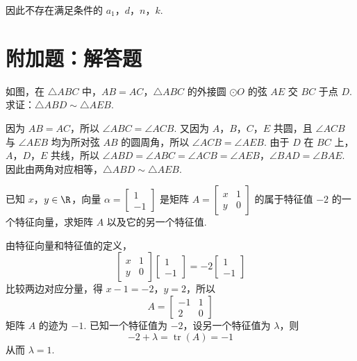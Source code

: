 \begin{solution}
\begin{enumerate}
因此不存在满足条件的 \(a_1\)，\(d\)，\(n\)，\(k\).
\end{enumerate}
\end{solution}

\section{附加题：解答题}

\begin{problem}[A]
如图，在 \(\triangle ABC\) 中，\(AB = AC\)，\(\triangle ABC\) 的外接圆 \(\odot O\) 的弦 \(AE\) 交 \(BC\) 于点 \(D\). 求证：\(\triangle ABD \sim \triangle AEB\).

\end{problem}

\begin{solution}
因为 \(AB=AC\)，所以 \(\angle ABC=\angle ACB\). 又因为 \(A\)，\(B\)，\(C\)，\(E\) 共圆，且 \(\angle ACB\) 与 \(\angle AEB\) 均为所对弦 \(AB\) 的圆周角，所以 \(\angle ACB=\angle AEB\). 由于 \(D\) 在 \(BC\) 上，\(A\)，\(D\)，\(E\) 共线，所以
\(\angle ABD=\angle ABC=\angle ACB=\angle AEB\)，\(\angle BAD=\angle BAE\).
因此由两角对应相等，\(\triangle ABD\sim\triangle AEB\).
\end{solution}

\reuseproblemnumber
\begin{problem}[B]
已知 \(x\)，\(y \in \R\)，向量 \(\alpha = \begin{bmatrix} 1 \\ -1 \end{bmatrix}\) 是矩阵 \(A = \begin{bmatrix} x & 1 \\ y & 0 \end{bmatrix}\) 的属于特征值 \(-2\) 的一个特征向量，求矩阵 \(A\) 以及它的另一个特征值.
\end{problem}

\begin{solution}
由特征向量和特征值的定义，
\[
\begin{bmatrix}x&1\\y&0\end{bmatrix}
\begin{bmatrix}1\\-1\end{bmatrix}
=-2\begin{bmatrix}1\\-1\end{bmatrix}
\]
比较两边对应分量，得 \(x-1=-2\)，\(y=2\)，所以
\[
A=\begin{bmatrix}-1&1\\2&0\end{bmatrix}
\]
矩阵 \(A\) 的迹为 \(-1\). 已知一个特征值为 \(-2\)，设另一个特征值为 \(\lambda\)，则
\[
-2+\lambda=\operatorname{tr}(A)=-1
\]
从而 \(\lambda=1\).
\end{solution}

